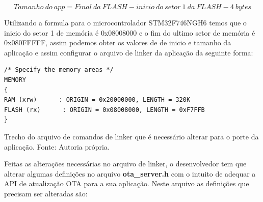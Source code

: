 \begin{equation}
    Tamanho\ do\ app = Final\ da\ FLASH - inicio\ do\ setor\ 1\ da\ FLASH - 4\ bytes 
    \label{eq:calculo_flash}
\end{equation}


Utilizando a formula para o microcontrolador STM32F746NGH6 temos que o inicio do setor 1 de memória é 0x08008000 e o fim do ultimo setor de memória é 0x080FFFFF, assim podemos obter os valores de de inicio e tamanho da aplicação e assim configurar o arquivo de linker da aplicação da seguinte forma:


\begin{algorithm}[H]
\begin{lstlisting}
/* Specify the memory areas */
MEMORY
{
RAM (xrw)      : ORIGIN = 0x20000000, LENGTH = 320K
FLASH (rx)      : ORIGIN = 0x08008000, LENGTH = 0xF7FFB
}
\end{lstlisting}
\caption{Trecho do arquivo de comandos de linker que é necessário alterar para o porte da aplicação.
\newline Fonte: Autoria própria.}
\end{algorithm}

Feitas as alterações necessárias no arquivo de linker, o desenvolvedor tem que alterar algumas definições no arquivo \textbf{ota\_server.h} com o intuito de adequar a API de atualização OTA para a sua aplicação. Neste arquivo as definições que precisam ser alteradas são:

